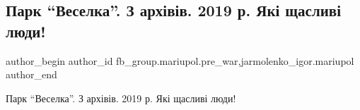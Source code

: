  
 
 
 
 

\subsection{Парк \enquote{Веселка}. З архівів. 2019 р. Які щасливі люди!}
\label{sec:28_01_2023.fb.fb_group.mariupol.pre_war.4.park__veselka___z_ar}
 
\ifcmt
 author_begin
   author_id fb_group.mariupol.pre_war,jarmolenko_igor.mariupol
 author_end
\fi

Парк \enquote{Веселка}. З архівів. 2019 р. Які щасливі люди!

